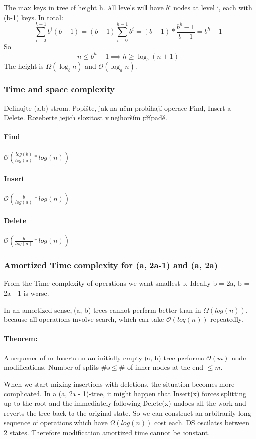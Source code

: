 \documentclass[12pt]{article}
\newcommand{\bigO}{\mathcal{O}}
\begin{document}
The max keys in tree of height h. All levels will have $b^i$ nodes at level i, each with (b-1) keys. In total:
\[ \sum_{i=0}^{h-1} b^i(b-1) = (b-1) \sum_{i=0}^{h-1} b^i = (b-1) * \frac{b^h - 1}{b-1} = b^h - 1 \]
So
\[ n \leq b^h - 1 \implies h \geq \log_b(n + 1) \]
 The height is $\Omega(\log_b n)$ and $\bigO(\log_a n)$.


\subsubsection{Time and space complexity}

    Definujte (a,b)-strom. Popište, jak na něm probíhají operace Find, Insert a Delete. Rozeberte jejich slozitost v nejhorším případě.

\paragraph{Find} $\bigO(\frac{log(b)}{log(a)}*log(n))$
\paragraph{Insert}  $\bigO(\frac{b}{log(a)}*log(n))$
\paragraph{Delete} $\bigO(\frac{b}{log(a)}*log(n))$

\subsubsection{Amortized Time complexity for (a, 2a-1) and (a, 2a) }
From the Time complexity of operations we want smallest b. Ideally b = 2a, b = 2a - 1 is worse.

In an amortized sense, (a, b)-trees cannot perform better than in $\Omega(log(n))$, because all operations involve search, which can take $\bigO(log(n))$ repeatedly.

\paragraph{Theorem:} A sequence of m Inserts on an initially empty (a, b)-tree performs $\bigO(m)$ node modifications.
Number of splits $ \#s \leq \# $ of inner nodes at the end $ \leq m$.

When we start mixing insertions with deletions, the situation becomes more complicated.
In a (a, 2a - 1)-tree, it might happen that Insert(x) forces splitting up to the root and
the immediately following Delete(x) undoes all the work and reverts the tree back to the original state. So we can construct an arbitrarily long sequence of operations which have $\Omega(log(n))$ cost each.
DS oscilates between 2 states. Therefore modification amortized time cannot be constant.
\end{document}
